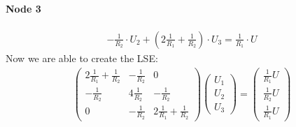 	\paragraph{Node 3}
		\begin{align*}
			-\frac{1}{R_2}\cdot U_2 +\left(2 \frac{1}{R_1}+\frac{1}{R_2}\right)\cdot U_3 = \frac{1}{R_1}\cdot U
		\end{align*}
	Now we are able to create the LSE:
	\begin{align*}
		\begin{pmatrix}
			2 \tfrac{1}{R_1}+\tfrac{1}{R_2} & -\tfrac{1}{R_2} & 0\\
			-\tfrac{1}{R_2} & 4 \tfrac{1}{R_2} & - \tfrac{1}{R_2}\\
			0 & - \tfrac{1}{R_2} & 2 \tfrac{1}{R_1}+ \tfrac{1}{R_2}
		\end{pmatrix}
		\begin{pmatrix}
			U_1\\
			U_2\\
			U_3
		\end{pmatrix} =
		\begin{pmatrix}
			\tfrac{1}{R_1} U\\
			\tfrac{1}{R_2} U\\
			\tfrac{1}{R_1}U
		\end{pmatrix}
	\end{align*}
	

